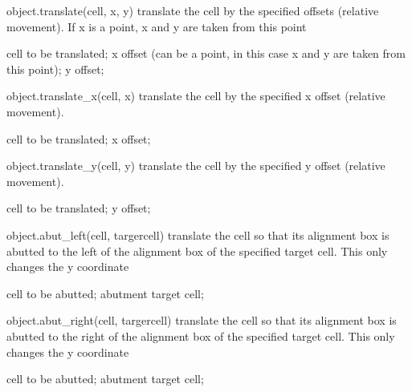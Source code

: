 \begin{APIfunc}{object.translate(cell, x, y)}
    translate the cell by the specified offsets (relative movement). If x is a point, x and y are taken from this point
    \begin{APIparameters}
            cell to be translated;
            x offset (can be a point, in this case x and y are taken from this point);
            y offset;
    \end{APIparameters}
\end{APIfunc}
\begin{APIfunc}{object.translate\_x(cell, x)}
    translate the cell by the specified x offset (relative movement).
    \begin{APIparameters}
            cell to be translated;
            x offset;
    \end{APIparameters}
\end{APIfunc}
\begin{APIfunc}{object.translate\_y(cell, y)}
    translate the cell by the specified y offset (relative movement).
    \begin{APIparameters}
            cell to be translated;
            y offset;
    \end{APIparameters}
\end{APIfunc}
\begin{APIfunc}{object.abut\_left(cell, targercell)}
    translate the cell so that its alignment box is abutted to the left of the alignment box of the specified target cell. This only changes the y coordinate
    \begin{APIparameters}
            cell to be abutted;
            abutment target cell;
    \end{APIparameters}
\end{APIfunc}
\begin{APIfunc}{object.abut\_right(cell, targercell)}
    translate the cell so that its alignment box is abutted to the right of the alignment box of the specified target cell. This only changes the y coordinate
    \begin{APIparameters}
            cell to be abutted;
            abutment target cell;
    \end{APIparameters}
\end{APIfunc}
